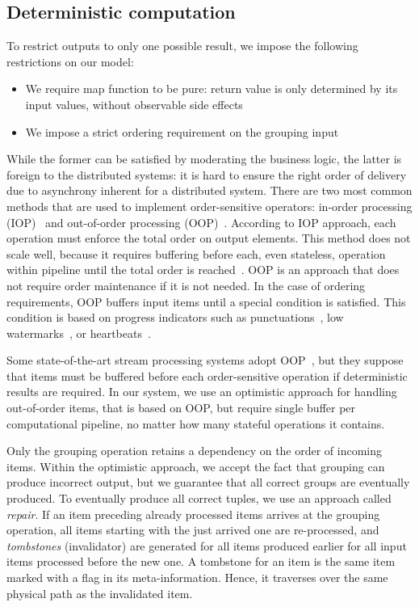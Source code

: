 \subsection {Deterministic computation}
\label {fs-collision} 

To restrict outputs to only one possible result, we impose the following  restrictions on our model: 

\begin{itemize}
  \item We require map function to be pure: return value is only determined by its input values, without observable side effects
  \item We impose a strict ordering requirement on the grouping  input
\end{itemize}

While the former can be satisfied by moderating the  business logic, the latter is foreign to the distributed systems: it is hard to ensure the right order of delivery due to asynchrony inherent for a distributed system. There are two most common methods that are used to implement order-sensitive operators: in-order processing (IOP)~\cite{Arasu:2006:CCQ:1146461.1146463, Cranor:2003:GSD:872757.872838} and out-of-order processing (OOP)~\cite{Li:2008:OPN:1453856.1453890}. According to IOP approach, each operation must enforce the total order on output elements. This method does not scale well, because it requires buffering before each, even stateless, operation within pipeline until the total order is reached~\cite{Li:2008:OPN:1453856.1453890}. OOP is an approach that does not require order maintenance if it is not needed. In the case of ordering requirements, OOP buffers input items until a special condition is satisfied. This condition is based on progress indicators such as punctuations~\cite{Tucker:2003:EPS:776752.776780}, low watermarks~\cite{Akidau:2013:MFS:2536222.2536229}, or heartbeats~\cite{Srivastava:2004:FTM:1055558.1055596}.  

Some state-of-the-art stream processing systems adopt OOP~\cite{Carbone:2017:SMA:3137765.3137777}, but they suppose that items must be buffered before each order-sensitive operation if deterministic results are required. In our system, we use an optimistic approach for handling out-of-order items, that is based on OOP, but require single buffer per computational pipeline, no matter how many stateful operations it contains.

Only the grouping operation retains a dependency on the order of incoming items. Within the  optimistic approach, we accept the fact that grouping can produce incorrect output, but we guarantee that all correct groups are eventually produced. To eventually produce all correct tuples, we use an approach called {\it repair}. If an item preceding already processed items arrives at the grouping operation, all items starting with the just arrived one are re-processed, and {\em tombstones} (invalidator) are generated for all items produced earlier for all input items processed before the new one. A tombstone for an item is the same item marked with a flag in its meta-information. Hence, it traverses over the same physical path as the invalidated item.

